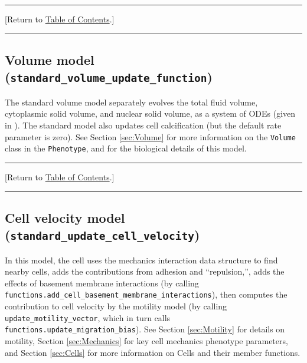 \documentclass[12pt]{article}
\renewcommand{\v}{\verb}
\renewcommand{\tt}[1]{{\small \left[\texttt{#1}\right] }}
\newcommand{\TOClink}{\begin{center}\hrule\vskip-5pt\phantom{.}\hfill[Return to \hyperlink{TOC}{Table of Contents}.]\hfill\phantom{.}\vskip3pt\hrule\end{center}}
\begin{document}
\TOClink 

\subsection{Volume model (\texttt{standard\_volume\_update\_function})}
\label{sec:Standard_Models:Volume}
The standard volume model separately evolves the total fluid volume, 
cytoplasmic solid volume, and nuclear solid volume, as a system of ODEs 
(given in \cite{ref:PhysiCell}). The standard model also updates 
cell calcification (but the default rate parameter is zero). 
%
%
%
%
%
See Section \ref{sec:Volume} for more information on the \v|Volume| class 
in the \v|Phenotype|, and \cite{ref:PhysiCell} for the biological 
details of this model. 
\TOClink 

\subsection{Cell velocity model (\texttt{standard\_update\_cell\_velocity})}
\label{sec:Standard_Models:Velocity}
In this model, the cell uses the mechanics interaction 
data structure to find nearby cells, adds the contributions 
from adhesion and ``repulsion,'', adds the effects of 
basement membrane interactions 
(by calling \v|functions.add_cell_basement_membrane_interactions|), 
then computes the contribution to cell velocity by the motility 
model (by calling \v|update_motility_vector|, 
which in turn calls \\
\v|functions.update_migration_bias|). 
See Section \ref{sec:Motility} for details on motility,
Section \ref{sec:Mechanics} for key cell mechanics phenotype 
parameters, and Section \ref{sec:Cells} for more information 
on Cells and their member functions. 
\end{document}
